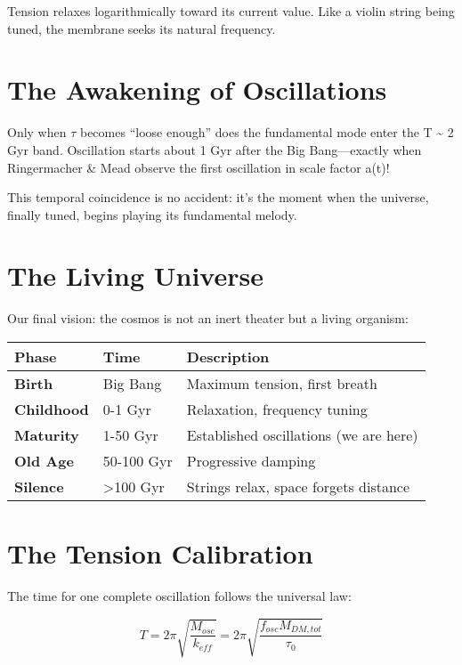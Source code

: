 \documentclass[
  11pt,
]{report}
\begin{document}
Tension relaxes logarithmically toward its current value. Like a violin
string being tuned, the membrane seeks its natural frequency.

\section{The Awakening of
Oscillations}\label{the-awakening-of-oscillations-1}

Only when \(\tau\) becomes ``loose enough'' does the fundamental mode
enter the T \textasciitilde{} 2 Gyr band. Oscillation starts about 1 Gyr
after the Big Bang---exactly when Ringermacher \& Mead observe the first
oscillation in scale factor a(t)!

This temporal coincidence is no accident: it's the moment when the
universe, finally tuned, begins playing its fundamental melody.

\section{The Living Universe}\label{the-living-universe}

Our final vision: the cosmos is not an inert theater but a living
organism:

\begin{longtable}[]{@{}lll@{}}
\toprule\noalign{}
Phase & Time & Description \\
\midrule\noalign{}
\endhead
\bottomrule\noalign{}
\endlastfoot
\textbf{Birth} & Big Bang & Maximum tension, first breath \\
\textbf{Childhood} & 0-1 Gyr & Relaxation, frequency tuning \\
\textbf{Maturity} & 1-50 Gyr & Established oscillations (we are here) \\
\textbf{Old Age} & 50-100 Gyr & Progressive damping \\
\textbf{Silence} & \textgreater100 Gyr & Strings relax, space forgets
distance \\
\end{longtable}

\section{The Tension Calibration}\label{the-tension-calibration}

The time for one complete oscillation follows the universal law:

\[T = 2\pi\sqrt{\frac{M_{osc}}{k_{eff}}} = 2\pi\sqrt{\frac{f_{osc} M_{DM,tot}}{\tau_0}}\]
\end{document}
